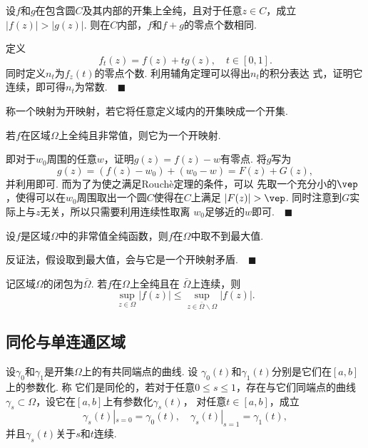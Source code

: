   \begin{thm}[Rouchè]
    \label{thm: Rouche}
    设$f$和$g$在包含圆$C$及其内部的开集上全纯，且对于任意$z\in C$，成立
    $|f(z)|>|g(z)|$. 则在$C$内部，$f$和$f+g$的零点个数相同.
  \end{thm}
  \proof
    定义
    \[
      f_t(z) = f(z) + tg(z),\quad t\in[0, 1].
    \]
    同时定义$n_t$为$f_z(t)$的零点个数. 利用辅角定理可以得出$n_t$的积分表达
    式，证明它连续，即可得$n_t$为常数.$\quad\blacksquare$

  \begin{defi}[开映射]
    称一个映射为开映射，若它将任意定义域内的开集映成一个开集.
  \end{defi}

  \begin{thm}[开映射]
    若$f$在区域$\Omega$上全纯且非常值，则它为一个开映射.
  \end{thm}
  \proof
    即对于$w_0$周围的任意$w$，证明$g(z)=f(z)-w$有零点. 将$g$写为
    \[
      g(z) = (f(z)-w_0) + (w_0-w) = F(z) + G(z),
    \]
    并利用即可. 而为了为使之满足Rouchè定理的条件，可以
    先取一个充分小的$\vep$，使得可以在$w_0$周围取出一个圆$C$使得在$C$上满足
    $|F(z)|>\vep$. 同时注意到$G$实际上与$z$无关，所以只需要利用连续性取离
    $w_0$足够近的$w$即可.$\quad\blacksquare$


   \begin{thm}[最大模原理]
    设$f$是区域$\Omega$中的非常值全纯函数，则$f$在$\Omega$中取不到最大值.
  \end{thm}
  \proof
    反证法，假设取到最大值，会与它是一个开映射矛盾.$\quad\blacksquare$

  \begin{cor}
    记区域$\Omega$的闭包为$\bar{\Omega}$. 若$f$在$\Omega$上全纯且在
    $\bar{\Omega}$上连续，则
    \[
      \sup_{z\in\Omega}|f(z)| \le \sup_{z\in\bar{\Omega}\backslash\Omega}|f(z)|.
    \]
  \end{cor}


\subsection{同伦与单连通区域}

  \begin{defi}[同伦]
    设$\gamma_0$和$\gamma_1$是开集$\Omega$上的有共同端点的曲线. 设
    $\gamma_0(t)$和$\gamma_1(t)$分别是它们在$[a,b]$上的参数化. 称
    它们是同伦的，若对于任意$0\le s\le 1$，存在与它们同端点的曲线
    $\gamma_s\subset\Omega$，设它在$[a,b]$上有参数化$\gamma_s(t)$，
    对任意$t\in [a,b]$，成立
    \[
      \gamma_s(t)|_{s=0} = \gamma_0(t),\quad 
      \gamma_s(t)|_{s=1} = \gamma_1(t),
    \]
    并且$\gamma_s(t)$关于$s$和$t$连续.
  \end{defi}

